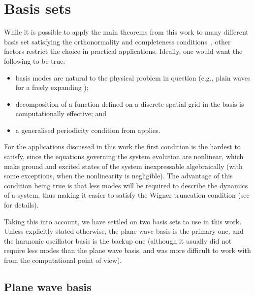 \chapter{Basis sets}
\label{cha:appendix:bases}

While it is possible to apply the main theorems from this work to many different basis set satisfying the orthonormality and completeness conditions~, other factors restrict the choice in practical applications.
Ideally, one would want the following to be true:
\begin{itemize}
    \item basis modes are natural to the physical problem in question (e.g., plain waves for a freely expanding );
    \item decomposition of a function defined on a discrete spatial grid in the basis is computationally effective; and
    \item a generalised periodicity condition from  applies.
\end{itemize}

For the applications discussed in this work the first condition is the hardest to satisfy, since the equations governing the system evolution are nonlinear, which make ground and excited states of the system inexpressable algebraically (with some exceptions, when the nonlinearity is negligible).
The advantage of this condition being true is that less modes will be required to describe the dynamics of a system, thus making it easier to satisfy the Wigner truncation condition (see  for details).

Taking this into account, we have settled on two basis sets to use in this work.
Unless explicitly stated otherwise, the plane wave basis is the primary one, and the harmonic oscillator basis is the backup one (although it usually did not require less modes than the plane wave basis, and was more difficult to work with from the computational point of view).


\section{Plane wave basis}


